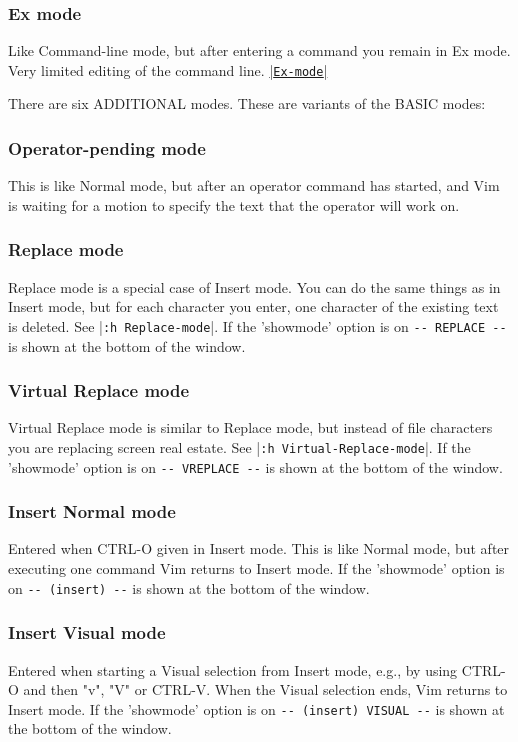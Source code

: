 \subsubsection{Ex mode}
Like Command-line mode, but after entering a command you remain in Ex mode.
Very limited editing of the command line.
\hyperref[Ex-mode]{|\texttt{Ex-mode}|}

There are six ADDITIONAL modes.  These are variants of the BASIC modes:


\subsubsection{Operator-pending mode}
\label{Operator-pending}
\label{Operator-pending-mode}
This is like Normal mode, but after an operator command has started, and Vim is waiting for a {motion} to specify the text that the operator will work on.

\subsubsection{Replace mode}
Replace mode is a special case of Insert mode.
You can do the same things as in Insert mode, but for each character you enter, one character of the existing text is deleted.
See |\verb!:h Replace-mode!|.
If the 'showmode' option is on \verb!-- REPLACE --! is shown at the bottom of the window.

\subsubsection{Virtual Replace mode}
Virtual Replace mode is similar to Replace mode, but instead of file characters you are replacing screen real estate.
See |\verb!:h Virtual-Replace-mode!|.
If the 'showmode' option is on \verb!-- VREPLACE --! is shown at the bottom of the window.

\subsubsection{Insert Normal mode}
Entered when CTRL-O given in Insert mode.
This is like Normal mode, but after executing one command Vim returns to Insert mode.
If the 'showmode' option is on \verb!-- (insert) --! is shown at the bottom of the window.

\subsubsection{Insert Visual mode}
Entered when starting a Visual selection from Insert mode, e.g., by using CTRL-O and then "v", "V" or CTRL-V.
When the Visual selection ends, Vim returns to Insert mode.
If the 'showmode' option is on \verb!-- (insert) VISUAL --! is shown at the bottom of the window.

